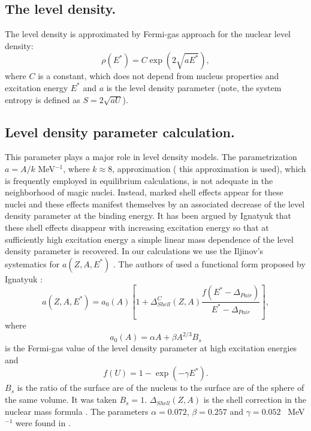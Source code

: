 \subsection{The level density.}

\hspace{1.0em}The level 
density is approximated by Fermi-gas approach \cite{IKP94} for the nuclear 
level density: 
\begin{equation}
\label{SFE13} \rho(E^{*}) = C\exp{(2\sqrt{aE^{*}})},
\end{equation}
where $C$ is a constant, which does not depend from nucleus properties
and excitation energy $E^{*}$ and $a$ is the level density parameter (note,
the system entropy is defined as $S=2\sqrt{aU}$). 


\subsection{Level density parameter calculation.}

\hspace{1.0em}This parameter plays a major role in level density models.
The parametrization $a=A/k$ MeV$^{-1}$, where $k\approx 8$,
approximation ( this approximation is used), which is frequently
employed in equilibrium calculations, is not adequate in the
neighborhood of magic nuclei.  Instead, marked shell effects appear for
these nuclei and these effects manifest themselves by an associated
decrease of the level density parameter at the binding energy. It has
been argued by Ignatyuk  \cite{Ignat75} that these shell
effects disappear with increasing excitation energy so that at
sufficiently high excitation energy a simple linear mass dependence of
the level density parameter is recovered. In our calculations we use 
the Iljinov's systematics for $a(Z,A,E^{*})$ \cite{Iljinov92}.
The authors of \cite{Iljinov92} used a functional form proposed 
by Ignatyuk  \cite{Ignat75}:
\begin{equation}
\label{SFE14}a(Z,A,E^{*}) = a_0(A)[1+
\Delta^{C}_{Shell}(Z,A)\frac{f(E^{*}-\Delta_{Pair})}
{E^{*}-\Delta_{Pair}}],
\end{equation}
where 
\begin{equation}
\label{SFE15}a_0(A)=\alpha A + \beta A^{2/3}B_s
\end{equation}
is the Fermi-gas value of the level density parameter at high excitation 
energies and 
\begin{equation}
\label{SFE16} f(U) = 1 - \exp{(-\gamma E^{*})}.
\end{equation}
 $B_s$ is the ratio of the surface are of the nucleus to the 
surface are of the sphere of the same volume. It was taken $B_s = 1$.
$\Delta_{Shell}(Z,A)$ is 
the shell correction in the nuclear mass formula \cite{CAM57}. 
The parameters $\alpha = 0.072$, $\beta = 0.257$ and $\gamma = 0.052$ 
\ MeV$^{-1}$ were found in \cite{Iljinov92}.

